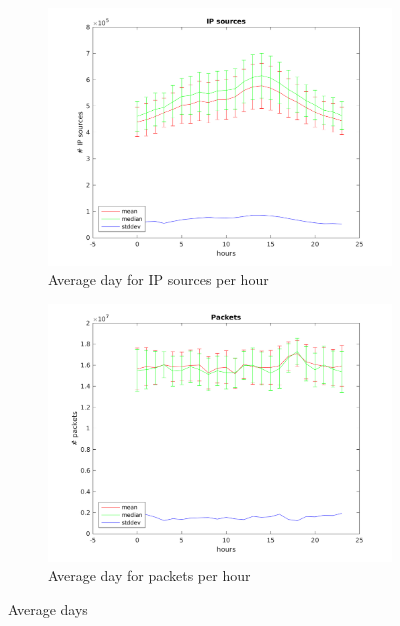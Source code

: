 \documentclass{article}
\begin{document}
\begin{figure}[h]
    \begin{subfigure}{.5\textwidth}
        \centering
        \includegraphics[width=\textwidth]{../exercise-3/plots/rep_22_ip_s}
        \caption{Average day for IP sources per hour}
    \end{subfigure}
    \begin{subfigure}{.5\textwidth}
        \centering
        \includegraphics[width=\textwidth]{../exercise-3/plots/rep_22_packets}
        \caption{Average day for packets per hour}
    \end{subfigure}
    \caption{\label{figure:rep-22} Average days}
\end{figure}
\end{document}
